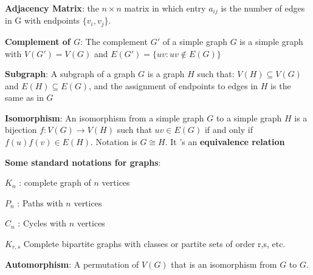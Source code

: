 \documentclass{article}
\theoremstyle{definition}
\theoremstyle{definition}
\theoremstyle{named}
\begin{document}
\begin{compactitem}
    
    \item \textbf{Adjacency Matrix}: the
$n \times n$ matrix in which entry $a_{ij}$ is the number
of edges in G with endpoints $\{v_i, v_j\}$.

    \item \textbf{Complement of $G$}: The complement $G'$ of a
simple graph $G$ is a simple graph with $V(G') = V(G)$ and  $E(G') = \{ uv : uv \notin E(G) \}$
    
    \item \textbf{Subgraph}: A subgraph of a graph $G$ is a graph $H$ such that:
$V(H) \subseteq V(G)$ and $E(H) \subseteq E(G)$, and the assignment of endpoints to edges in $H$ is the same as in $G$

    \item \textbf{Isomorphism}: An isomorphism from a simple graph $G$ to a
simple graph $H$ is a bijection $f:V(G) \rightarrow V(H)$ such
that $uv \in E(G)$ if and only if $f(u)f(v) \in E(H)$. Notation is $G \cong H$. It
's an \textbf{equivalence relation}
    \item \textbf{Some standard notations for graphs}:
    \begin{compactitem}
        \item $K_n$ : complete graph of $n$ vertices
        \item $P_n$ : Paths with $n$ vertices
        \item $C_n$ : Cycles with $n$ vertices
        \item $K_{r,s}$ Complete bipartite graphs with classes or partite
sets of order r,s, etc.
    
    \end{compactitem}
    \item \textbf{Automorphism}: A permutation of
$V(G)$ that is an isomorphism from $G$ to $G$.
\end{compactitem}
\end{document}
